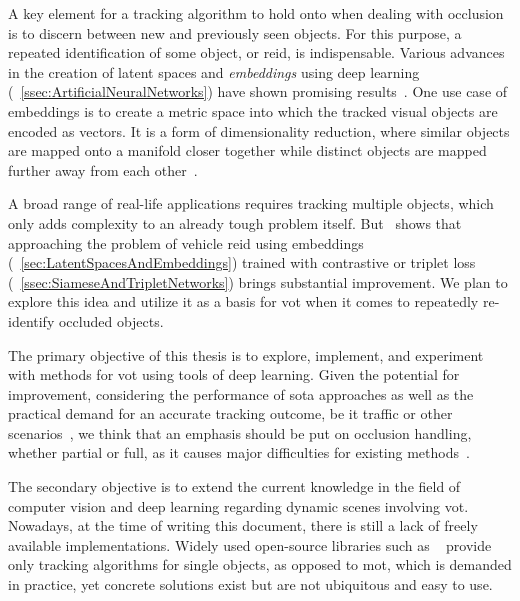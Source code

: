A key element for a tracking algorithm to hold onto when dealing with occlusion is to discern between new and previously seen objects. For this purpose, a repeated identification of some object, or \gls{reid}, is indispensable. Various advances in the creation of latent spaces and \emph{embeddings} using deep learning (\sectiontext{}~\ref{ssec:ArtificialNeuralNetworks}) have shown promising results~\cite{schroff2015facenet, taigman2014deepface}. One use case of embeddings is to create a metric space into which the tracked visual objects are encoded as vectors. It is a form of dimensionality reduction, where similar objects are mapped onto a manifold closer together while distinct objects are mapped further away from each other~\cite{hadsell2006dimreduction}.

A broad range of real-life applications requires tracking multiple objects, which only adds complexity to an already tough problem itself. But~\cite{kuma2019vehiclereid} shows that approaching the problem of vehicle \gls{reid} using embeddings (\sectiontext{}~\ref{sec:LatentSpacesAndEmbeddings}) trained with contrastive or triplet loss (\sectiontext{}~\ref{ssec:SiameseAndTripletNetworks}) brings substantial improvement. We plan to explore this idea and utilize it as a basis for \gls{vot} when it comes to repeatedly re-identify occluded objects.

The primary objective of this thesis is to explore, implement, and experiment with methods for \gls{vot} using tools of deep learning. Given the potential for improvement, considering the performance of \gls{sota} approaches as well as the practical demand for an accurate tracking outcome, be it traffic or other scenarios~\cite{tang2019cityflow}, we think that an emphasis should be put on occlusion handling, whether partial or full, as it causes major difficulties for existing methods~\cite{jiyan2007robustocclusion}.

The secondary objective is to extend the current knowledge in the field of computer vision and deep learning regarding dynamic scenes involving \gls{vot}. Nowadays, at the time of writing this document, there is still a lack of freely available implementations. Widely used open-source libraries such as \opencv{}~\cite{bradski2000opencv} provide only tracking algorithms for single objects, as opposed to \gls{mot}, which is demanded in practice, yet concrete solutions exist but are not ubiquitous and easy to use.

